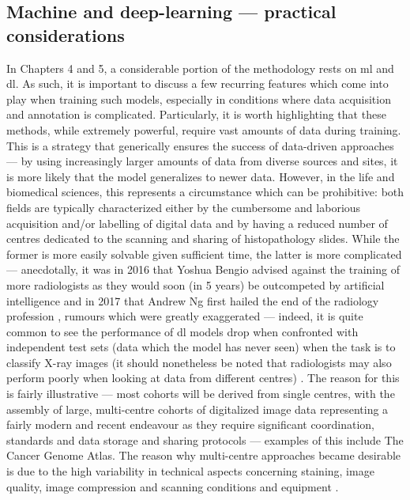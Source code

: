 \begin{figure}
	\label{fig:u-net}
\end{figure}

\subsection{Machine and deep-learning --- practical considerations}

In Chapters 4 and 5, a considerable portion of the methodology rests on \ac{ml} and \ac{dl}. As such, it is important to discuss a few recurring features which come into play when training such models, especially in conditions where data acquisition and annotation is complicated. Particularly, it is worth highlighting that these methods, while extremely powerful, require vast amounts of data during training. This is a strategy that generically ensures the success of data-driven approaches --- by using increasingly larger amounts of data from diverse sources and sites, it is more likely that the model generalizes to newer data. However, in the life and biomedical sciences, this represents a circumstance which can be prohibitive: both fields are typically characterized either by the cumbersome and laborious acquisition and/or labelling of digital data and by having a reduced number of centres dedicated to the scanning and sharing of histopathology slides. While the former is more easily solvable given sufficient time, the latter is more complicated --- anecdotally, it was in 2016 that Yoshua Bengio advised against the training of more radiologists as they would soon (in 5 years) be outcompeted by artificial intelligence \cite{Creative_Destruction_Lab2016-zf} and in 2017 that Andrew Ng first hailed the end of the radiology profession \cite{Ng2017-tz}, rumours which were greatly exaggerated --- indeed, it is quite common to see the performance of \ac{dl} models drop when confronted with independent test sets (data which the model has never seen) when the task is to classify X-ray images (it should nonetheless be noted that radiologists may also perform poorly when looking at data from different centres) \cite{Rajpurkar2021-bj}. The reason for this is fairly illustrative --- most cohorts will be derived from single centres, with the assembly of large, multi-centre cohorts of digitalized image data representing a fairly modern and recent endeavour as they require significant coordination, standards and data storage and sharing protocols --- examples of this include The Cancer Genome Atlas. The reason why multi-centre approaches became desirable is due to the high variability in technical aspects concerning staining, image quality, image compression and scanning conditions and equipment \cite{Van_der_Laak2021-id}.

